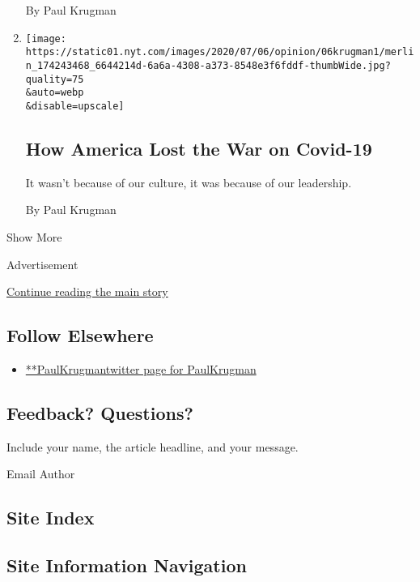 \begin{enumerate}
  By Paul Krugman
\item
  \href{/2020/07/06/opinion/covid-19-trump.html}{}

  \texttt{[image: https://static01.nyt.com/images/2020/07/06/opinion/06krugman1/merlin\_174243468\_6644214d-6a6a-4308-a373-8548e3f6fddf-thumbWide.jpg?quality=75\\\&auto=webp\\\&disable=upscale]}

  \hypertarget{how-america-lost-the-war-on-covid-19}{%
  \subsection{How America Lost the War on
  Covid-19}\label{how-america-lost-the-war-on-covid-19}}

  It wasn't because of our culture, it was because of our leadership.

  By Paul Krugman
\end{enumerate}

Show More

Advertisement

\protect\hyperlink{after-mid2}{Continue reading the main story}

\hypertarget{follow-elsewhere}{%
\subsection{Follow Elsewhere}\label{follow-elsewhere}}

\begin{itemize}
\tightlist
\item
  \href{https://twitter.com/PaulKrugman}{**PaulKrugmantwitter page for
  PaulKrugman}
\end{itemize}

\hypertarget{feedback-questions}{%
\subsection{Feedback? Questions?}\label{feedback-questions}}

Include your name, the article headline, and your message.

Email Author

\hypertarget{site-index}{%
\subsection{Site Index}\label{site-index}}

\hypertarget{site-information-navigation}{%
\subsection{Site Information
Navigation}\label{site-information-navigation}}

